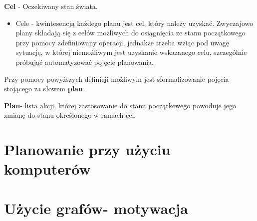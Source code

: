     \begin{definition}
    \label{Cel}
        \textbf{Cel} - Oczekiwany stan świata.
    \end{definition}
    \begin{itemize}
        \item Cele - kwintesencją każdego planu jest cel, który należy uzyskać. Zwyczajowo plany składają się z celów możliwych do
        osiągnięcia ze stanu początkowego przy pomocy zdefiniowany operacji, jednakże trzeba wziąc pod uwagę sytuację, w której 
        niemożliwym jest uzyskanie wskazanego celu, szczególnie próbująć automatyzować pojęcie planowania.
    \end{itemize} 
    Przy pomocy powyższych definicji możliwym jest sformalizowanie pojęcia stojącego za słowem \textbf{plan}. 
    \begin{definition}
    \label{Plan}
    \textbf{Plan}- lista akcji, której zastosowanie do stanu początkowego powoduje jego zmianę do stanu określonego w ramach cel. 
    \end{definition}


\section{Planowanie przy użyciu komputerów}
    
\section{Użycie grafów- motywacja}




